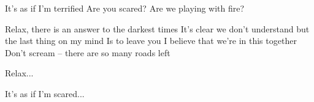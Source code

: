 \documentclass[../../../songbook.tex]{subfiles}
\begin{document}
It’s as if I’m terrified		  \newline
Are you scared?				 \newline
Are we playing with fire?	  \newline

Relax, there is an answer to the darkest times \newline
It’s clear we don’t understand  \newline
but the last thing on my mind \newline
Is to leave you \newline
I believe that we’re in this together \newline
Don’t scream – there are so many roads left \newline

\-\hspace{1cm} Relax... \newline

It’s as if I’m scared... \newline
\end{document}
